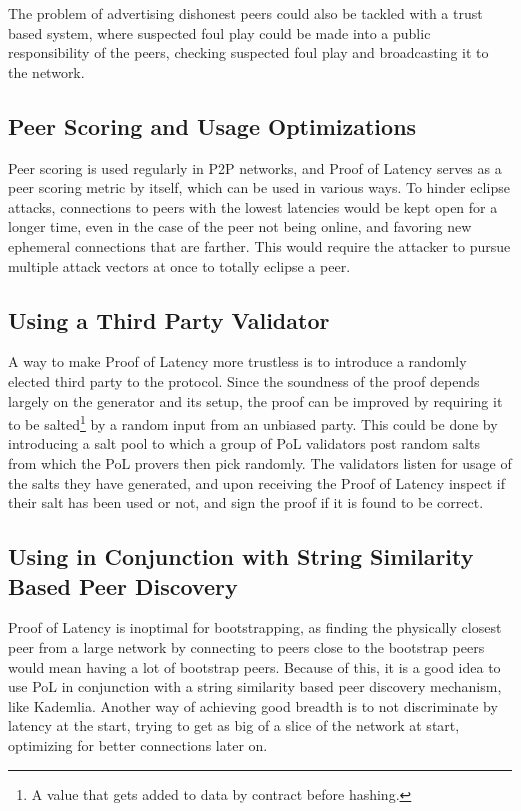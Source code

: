 The problem of advertising dishonest peers could also be tackled with a trust based system, where suspected foul play could be made into a public responsibility of the peers, checking suspected foul play and broadcasting it to the network.

\subsection{Peer Scoring and Usage Optimizations}
Peer scoring is used regularly in P2P networks, and Proof of Latency serves as a peer scoring metric by itself, which can be used in various ways. To hinder eclipse attacks, connections to peers with the lowest latencies would be kept open for a longer time, even in the case of the peer not being online, and favoring new ephemeral connections that are farther. This would require the attacker to pursue multiple attack vectors at once to totally eclipse a peer.

\subsection{Using a Third Party Validator}
A way to make Proof of Latency more trustless is to introduce a randomly elected third party to the protocol. Since the soundness of the proof depends largely on the generator and its setup, the proof can be improved by requiring it to be salted\footnote{A value that gets added to data by contract before hashing.} by a random input from an unbiased party. This could be done by introducing a salt pool to which a group of PoL validators post random salts from which the PoL provers then pick randomly. The validators listen for usage of the salts they have generated, and upon receiving the Proof of Latency inspect if their salt has been used or not, and sign the proof if it is found to be correct.

\subsection{Using in Conjunction with String Similarity Based Peer Discovery}
Proof of Latency is inoptimal for bootstrapping, as finding the physically closest peer from a large network by connecting to peers close to the bootstrap peers would mean having a lot of bootstrap peers. Because of this, it is a good idea to use PoL in conjunction with a string similarity based peer discovery mechanism, like Kademlia. Another way of achieving good breadth is to not discriminate by latency at the start, trying to get as big of a slice of the network at start, optimizing for better connections later on.

